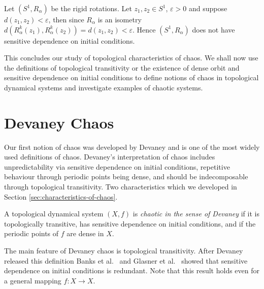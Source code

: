\begin{exmp} \label{exmp:rigid-rotations-not-sensitive}
    Let $(S^1, R_\alpha)$ be the rigid rotations. Let $z_1,z_2 \in S^1$, $\varepsilon > 0$ and suppose $d(z_1, z_2) < \varepsilon$, then since $R_\alpha$ is an isometry $d(R_\alpha^k(z_1), R_\alpha^k(z_2)) = d(z_1, z_2) < \varepsilon$. Hence $(S^1, R_\alpha)$ does not have sensitive dependence on initial conditions.
\end{exmp}

This concludes our study of topological characteristics of chaos. We shall now use the definitions of topological transitivity or the existence of dense orbit and sensitive dependence on initial conditions to define notions of chaos in topological dynamical systems and investigate examples of chaotic systems.

\section{Devaney Chaos} \label{sec:devaney-chaos}

Our first notion of chaos was developed by Devaney \cite{devaney} and is one of the most widely used definitions of chaos. Devaney's interpretation of chaos includes unpredictability via sensitive dependence on initial conditions, repetitive behaviour through periodic points being dense, and should be indecomposable through topological transitivity. Two characteristics which we developed in Section \ref{sec:characteristics-of-chaos}.

\begin{defn}  \label{defn:devaney-chaos}
    A topological dynamical system $(X, f)$ is \emph{chaotic in the sense of Devaney} if it is topologically transitive, has sensitive dependence on initial conditions, and if the periodic points of $f$ are dense in $X$.
\end{defn}

The main feature of Devaney chaos is topological transitivity. After Devaney released this definition Banks et al.\ \cite{bbcds} and Glasner et al.\ \cite{glasner-weiss} showed that sensitive dependence on initial conditions is redundant. Note that this result holds even for a general mapping $f: X \to X$.

